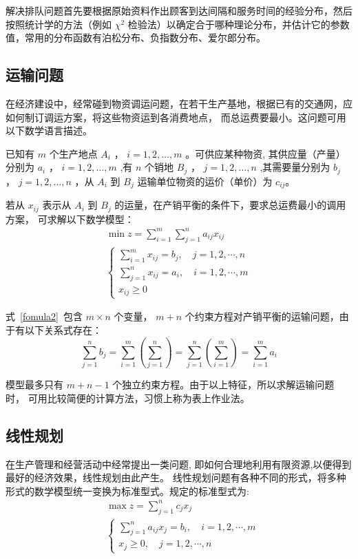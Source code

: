 解决排队问题首先要根据原始资料作出顾客到达间隔和服务时间的经验分布，然后
按照统计学的方法（例如 $\chi^2$ 检验法）以确定合于哪种理论分布，并估计它的参数值，常用的分布函数有泊松分布、负指数分布、爱尔郎分布。
\subsection{运输问题}
在经济建设中，经常碰到物资调运问题，在若干生产基地，根据已有的交通网，应如何制订调运方案，将这些物资运到各消费地点，
而总运费要最小。这问题可用以下数学语言描述。

已知有 $m$ 个生产地点 $A_i$ ， $i = 1, 2, …, m$ 。可供应某种物资, 其供应量（产量）分别为
$a_i$ ， $ i = 1, 2, …, m$ ,有 $n$ 个销地 $B_j$ ， $ j = 1, 2,…, n$ ,其需要量分别为 $b_j$ ， $ j = 1, 2, …, n$ ，从 $A_i$ 到
$B_j$ 运输单位物资的运价（单价）为 $c_{ij}$。

若从 $x_{ij}$ 表示从 $A_i$ 到 $B_j$ 的运量，在产销平衡的条件下，要求总运费最小的调用方案，
可求解以下数学模型：
\begin{equation}\label{fomula2}
    \begin{array}{l} 
        \min z=\sum_{i=1}^{m} \sum_{j=1}^{n} a_{i j} x_{i j} \\
        \left\{\begin{array}{l}
        \sum_{i=1}^{m} x_{i j}=b_{j}, \quad j=1,2, \cdots, n \\
        \sum_{j=1}^{n} x_{i j}=a_{i}, \quad i=1,2, \cdots, m \\
        x_{i j} \geqslant 0
        \end{array}\right.
        \end{array}
\end{equation}

式~\ref{fomula2}~包含 $m \times n$ 个变量， $m+n$ 个约束方程对产销平衡的运输问题，由于有以下关系式存在：
$$\sum_{j=1}^{n} b_j = \sum_{i = 1}^{m} \left ( \sum_{j=1}^{n} \right ) = \sum_{j=1}^{n} \left ( \sum_{i=1}^{m} \right ) = \sum_{i=1}^{m} a_i$$

模型最多只有 $m+n-1$ 个独立约束方程。由于以上特征，所以求解运输问题时，
可用比较简便的计算方法，习惯上称为表上作业法。

\subsection{线性规划}
在生产管理和经营活动中经常提出一类问题, 即如何合理地利用有限资源,以便得到最好的经济效果，线性规划由此产生。
线性规划问题有各种不同的形式，将多种形式的数学模型统一变换为标准型式。规定的标准型式为:
$$\begin{aligned}
    & \max z =\sum_{j=1}^{n} c_{j} x_{j} \\
    & \left\{\begin{array}{l}
    \sum_{j=1}^{n} a_{i j} x_{j}=b_{i}, \quad i=1,2, \cdots, m \\
    x_{j} \geqslant 0, \quad j=1,2, \cdots, n
    \end{array}\right.
    \end{aligned}$$

